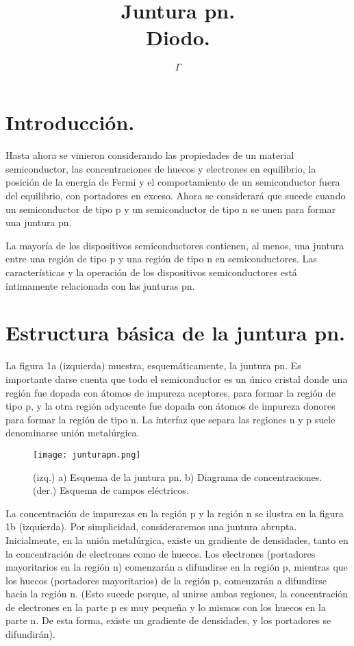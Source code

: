 \documentclass[12pt,a4paper]{article}
\begin{document}
\title{Juntura pn.\\Diodo.}

\author{$\Gamma$}

\maketitle

\section{Introducción.}

Hasta ahora se vinieron considerando las propiedades de un material semiconductor, las concentraciones de huecos y electrones en equilibrio, la posición de la energía de Fermi y el comportamiento de un semiconductor fuera del equilibrio, con portadores en exceso. Ahora se considerará que sucede cuando un semiconductor de tipo p y un semiconductor de tipo n se unen para formar una juntura pn.

La mayoría de los dispositivos semiconductores contienen, al menos, una juntura entre una región de tipo p y una región de tipo n en semiconductores. Las características y la operación de los dispositivos semiconductores está íntimamente relacionada con las junturas pn.

\section{Estructura básica de la juntura pn.}

La figura 1a (izquierda) muestra, esquemáticamente, la juntura pn. Es importante darse cuenta que todo el semiconductor es un único cristal donde una región fue dopada con átomos de impureza aceptores, para formar la región de tipo p, y la otra región adyacente fue dopada con átomos de impureza donores para formar la región de tipo n. La interfaz que separa las regiones n y p suele denominarse unión metalúrgica.

\begin{figure}[ht!]
\begin{center}
\texttt{[image: junturapn.png]}
\caption{(izq.) a) Esquema de la juntura pn. b) Diagrama de concentraciones. (der.) Esquema de campos eléctricos.}
\end{center}
\end{figure}

La concentración de impurezas en la región p y la región n se ilustra en la figura 1b (izquierda). Por simplicidad, consideraremos una juntura abrupta. Inicialmente, en la unión metalúrgica, existe un gradiente de densidades, tanto en la concentración de electrones como de huecos. Los electrones (portadores mayoritarios en la región n) comenzarán a difundirse en la región p, mientras que los huecos (portadores mayoritarios) de la región p, comenzarán a difundirse hacia la región n. (Esto sucede porque, al unirse ambas regiones, la concentración de electrones en la parte p es muy pequeña y lo mismos con los huecos en la parte n. De esta forma, existe un gradiente de densidades, y los portadores se difundirán).
\end{document}
